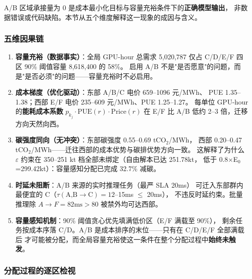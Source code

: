 \documentclass{internal-report}
\begin{document}
\label{sec:ab-empty}

A/B 区域承接量为 0 是成本最小化目标与容量充裕条件下的\textbf{正确模型输出}，
非数据错误或代码缺陷。本节从五个维度解释这一现象的成因与含义。

\subsubsection{五维因果链}

\begin{enumerate}
  \item \textbf{容量充裕（数据事实）}：全局 GPU-hour 总需求 5{,}020{,}787
        仅占 C/D/E/F 四区 90\% 阈值容量 8{,}618{,}400 的 58\%。
        启用 A/B 不是"是否愿意"的问题，而是"是否必须"的问题——容量充裕时不必启用。

  \item \textbf{成本梯度（优化驱动）}：东部 A/B/C 电价 659--1096 元/MWh、
        PUE 1.35--1.38；西部 E/F 电价 235--609 元/MWh、PUE 1.25--1.27。
        每单位 GPU-hour 的\textbf{能耗成本系数} $p_{k_j}\!\cdot\!\text{PUE}(r)\!\cdot\!\text{Price}(r)$
        在 E/F 比 A/B 低约 2--3 倍，迁移方向天然向西。

  \item \textbf{碳强度同向（无冲突）}：东部碳强度 0.55--0.69 tCO$_2$/MWh，
        西部 0.20--0.47 tCO$_2$/MWh——迁往西部的成本优势与碳排优势方向一致。
        这解释了为什么 $\varepsilon$ 约束在 350--251 kt 档全部未绑定（自由解本已达 251.78kt，
        低于 0.8$\times$E$_0$=299.42kt）：容量感知分配已完成 32.7\% 减碳。

  \item \textbf{时延未阻断}：A/B 来源的实时推理任务（最严 SLA 20ms）
        可迁入东部群内最便宜的 C（$\tau(\text{A,B}\to\text{C})=12$--15ms $\le$ 20ms），
        不违反时延约束。批量推理除 $A\to F=82\text{ms}>80$ 被禁外均可达西部。

  \item \textbf{容量感知机制}：90\% 阈值贪心优先填满低价区（E/F 满载至 90\%），
        剩余任务按成本序落 C/D。A/B 是成本排序的末位——只有在 C/D/E/F 全部满载后
        才可能被分配，而全局容量充裕使这一条件在整个分配过程中\textbf{始终未触发}。
\end{enumerate}

\subsubsection{分配过程的逐区检视}
\end{document}
